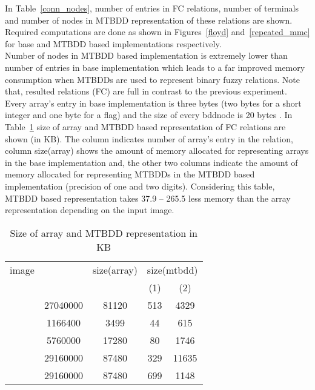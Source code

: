 \documentclass[4pt]{article}
\begin{document}
In Table~\ref{conn_nodes}, number of entries in FC relations, number of terminals and number of nodes in MTBDD representation of these relations are shown. Required computations are done as shown in Figures~\ref{floyd} and~\ref{repeated_mmc} for base and MTBDD based implementations respectively.\\ 
Number of nodes in MTBDD based implementation is extremely lower than number of entries in base implementation which leads to a far improved memory consumption when MTBDDs are used to represent binary fuzzy relations. Note that, resulted relations (FC) are full in contrast to the previous experiment. Every array's entry in base implementation is three bytes (two bytes for a short integer and one byte for a flag) and the size of every bddnode is 20 bytes \cite{buddy}. In Table~\ref{conn_nodes_kb} size of array and MTBDD based representation of FC relations are shown (in KB). The column  indicates number of array's entry in the relation, column size(array) shows the amount of memory allocated for representing arrays in the base implementation and, the other two columns indicate the amount of memory allocated for representing MTBDDs in the MTBDD based implementation (precision of one and two digits). Considering this table, MTBDD based representation takes 37.9 -- 265.5 less memory than the array representation depending on the input image.
\begin{table}
\begin{footnotesize}
\caption{Size of array and MTBDD representation in KB}
\label{conn_nodes_kb}

\begin{center}
\begin{tabular} {| c | c | c | cc | }
\hline
image  &    & size(array) & \multicolumn{2}{c}{size(mtbdd)} \vline \\
       &            &             &  (1)  &  (2)  \\ \hline

   &   27040000   & 81120 &  513 & 4329 \\ \hline
   &   1166400    & 3499 &  44 & 615 \\ \hline
   &   5760000    & 17280 &  80 & 1746 \\ \hline
   &   29160000   & 87480 &  329 & 11635 \\ \hline
   &   29160000   & 87480 &  699 & 1148 \\ \hline
\end{tabular} 
\end{center}

\end{footnotesize}
\end{table}
\end{document}
